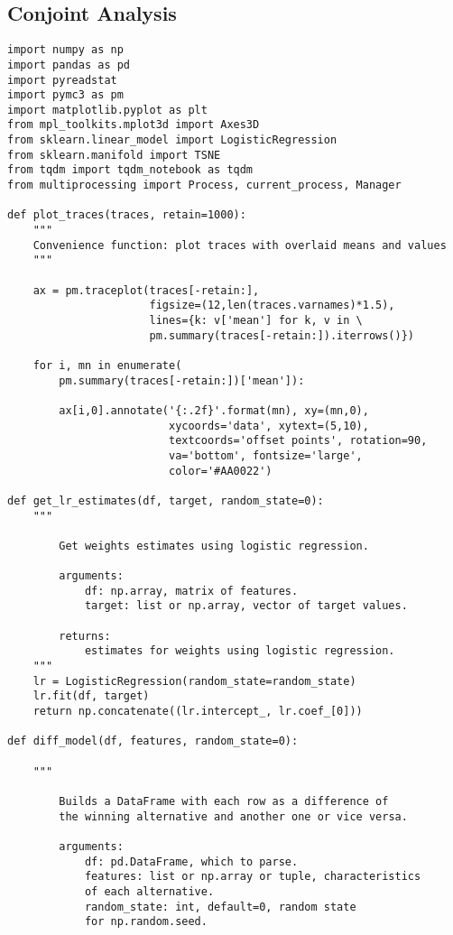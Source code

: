 \documentclass[a4paper, 12pt]{extreport}
\begin{document}
\subsection{Conjoint Analysis} \label{app_2}
\begin{verbatim}
import numpy as np
import pandas as pd
import pyreadstat
import pymc3 as pm
import matplotlib.pyplot as plt
from mpl_toolkits.mplot3d import Axes3D
from sklearn.linear_model import LogisticRegression
from sklearn.manifold import TSNE
from tqdm import tqdm_notebook as tqdm
from multiprocessing import Process, current_process, Manager

def plot_traces(traces, retain=1000):
    """
    Convenience function: plot traces with overlaid means and values
    """

    ax = pm.traceplot(traces[-retain:],
                      figsize=(12,len(traces.varnames)*1.5),
                      lines={k: v['mean'] for k, v in \
                      pm.summary(traces[-retain:]).iterrows()})

    for i, mn in enumerate(
        pm.summary(traces[-retain:])['mean']):

        ax[i,0].annotate('{:.2f}'.format(mn), xy=(mn,0),
                         xycoords='data', xytext=(5,10),
                         textcoords='offset points', rotation=90,
                         va='bottom', fontsize='large',
                         color='#AA0022')

def get_lr_estimates(df, target, random_state=0):
    """

        Get weights estimates using logistic regression.

        arguments:
            df: np.array, matrix of features.
            target: list or np.array, vector of target values.

        returns:
            estimates for weights using logistic regression.
    """
    lr = LogisticRegression(random_state=random_state)
    lr.fit(df, target)
    return np.concatenate((lr.intercept_, lr.coef_[0]))

def diff_model(df, features, random_state=0):

    """

        Builds a DataFrame with each row as a difference of
        the winning alternative and another one or vice versa.

        arguments:
            df: pd.DataFrame, which to parse.
            features: list or np.array or tuple, characteristics
            of each alternative.
            random_state: int, default=0, random state
            for np.random.seed.


\end{verbatim}
\end{document}
